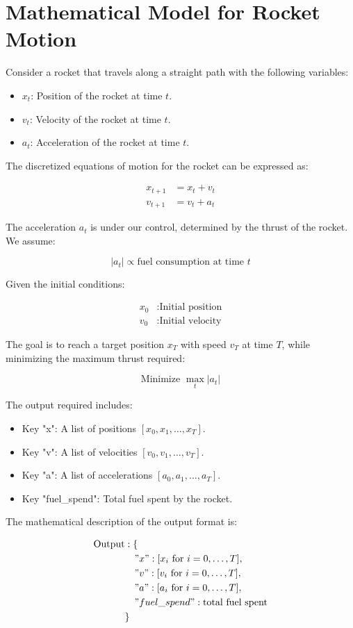 \documentclass{article}
\begin{document}
\section*{Mathematical Model for Rocket Motion}

Consider a rocket that travels along a straight path with the following variables:

\begin{itemize}
    \item $x_t$: Position of the rocket at time $t$.
    \item $v_t$: Velocity of the rocket at time $t$.
    \item $a_t$: Acceleration of the rocket at time $t$.
\end{itemize}

The discretized equations of motion for the rocket can be expressed as:

\begin{align}
    x_{t+1} &= x_t + v_t \tag{1} \\
    v_{t+1} &= v_t + a_t \tag{2}
\end{align}

The acceleration $a_t$ is under our control, determined by the thrust of the rocket. We assume:

\[
|a_t| \propto \text{fuel consumption at time } t \tag{3}
\]

Given the initial conditions:

\begin{align*}
    x_0 & : \text{Initial position} \\
    v_0 & : \text{Initial velocity}
\end{align*}

The goal is to reach a target position $x_T$ with speed $v_T$ at time $T$, while minimizing the maximum thrust required:

\[
\text{Minimize } \max_{t} |a_t| \tag{4}
\]

The output required includes:

\begin{itemize}
    \item Key "x": A list of positions $[x_0, x_1, \ldots, x_T]$.
    \item Key "v": A list of velocities $[v_0, v_1, \ldots, v_T]$.
    \item Key "a": A list of accelerations $[a_0, a_1, \ldots, a_T]$.
    \item Key "fuel\_spend": Total fuel spent by the rocket.
\end{itemize}

The mathematical description of the output format is:

\[
\begin{aligned}
    \text{Output} &: \{ \\
    &\quad "x": [x_i \text{ for } i = 0, \ldots, T], \\
    &\quad "v": [v_i \text{ for } i = 0, \ldots, T], \\
    &\quad "a": [a_i \text{ for } i = 0, \ldots, T], \\
    &\quad "fuel\_spend": \text{total fuel spent} \\
    &\}
\end{aligned}
\]
\end{document}
